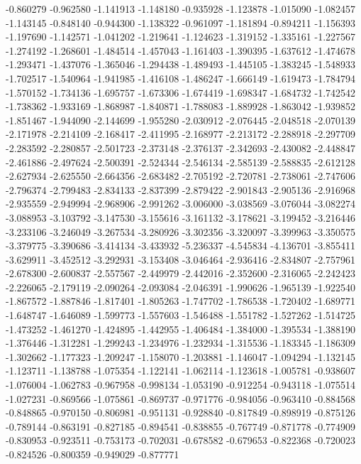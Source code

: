 -0.860279
-0.962580
-1.141913
-1.148180
-0.935928
-1.123878
-1.015090
-1.082457
-1.143145
-0.848140
-0.944300
-1.138322
-0.961097
-1.181894
-0.894211
-1.156393
-1.197690
-1.142571
-1.041202
-1.219641
-1.124623
-1.319152
-1.335161
-1.227567
-1.274192
-1.268601
-1.484514
-1.457043
-1.161403
-1.390395
-1.637612
-1.474678
-1.293471
-1.437076
-1.365046
-1.294438
-1.489493
-1.445105
-1.383245
-1.548933
-1.702517
-1.540964
-1.941985
-1.416108
-1.486247
-1.666149
-1.619473
-1.784794
-1.570152
-1.734136
-1.695757
-1.673306
-1.674419
-1.698347
-1.684732
-1.742542
-1.738362
-1.933169
-1.868987
-1.840871
-1.788083
-1.889928
-1.863042
-1.939852
-1.851467
-1.944090
-2.144699
-1.955280
-2.030912
-2.076445
-2.048518
-2.070139
-2.171978
-2.214109
-2.168417
-2.411995
-2.168977
-2.213172
-2.288918
-2.297709
-2.283592
-2.280857
-2.501723
-2.373148
-2.376137
-2.342693
-2.430082
-2.448847
-2.461886
-2.497624
-2.500391
-2.524344
-2.546134
-2.585139
-2.588835
-2.612128
-2.627934
-2.625550
-2.664356
-2.683482
-2.705192
-2.720781
-2.738061
-2.747606
-2.796374
-2.799483
-2.834133
-2.837399
-2.879422
-2.901843
-2.905136
-2.916968
-2.935559
-2.949994
-2.968906
-2.991262
-3.006000
-3.038569
-3.076044
-3.082274
-3.088953
-3.103792
-3.147530
-3.155616
-3.161132
-3.178621
-3.199452
-3.216446
-3.233106
-3.246049
-3.267534
-3.280926
-3.302356
-3.320097
-3.399963
-3.350575
-3.379775
-3.390686
-3.414134
-3.433932
-5.236337
-4.545834
-4.136701
-3.855411
-3.629911
-3.452512
-3.292931
-3.153408
-3.046464
-2.936416
-2.834807
-2.757961
-2.678300
-2.600837
-2.557567
-2.449979
-2.442016
-2.352600
-2.316065
-2.242423
-2.226065
-2.179119
-2.090264
-2.093084
-2.046391
-1.990626
-1.965139
-1.922540
-1.867572
-1.887846
-1.817401
-1.805263
-1.747702
-1.786538
-1.720402
-1.689771
-1.648747
-1.646089
-1.599773
-1.557603
-1.546488
-1.551782
-1.527262
-1.514725
-1.473252
-1.461270
-1.424895
-1.442955
-1.406484
-1.384000
-1.395534
-1.388190
-1.376446
-1.312281
-1.299243
-1.234976
-1.232934
-1.315536
-1.183345
-1.186309
-1.302662
-1.177323
-1.209247
-1.158070
-1.203881
-1.146047
-1.094294
-1.132145
-1.123711
-1.138788
-1.075354
-1.122141
-1.062114
-1.123618
-1.005781
-0.938607
-1.076004
-1.062783
-0.967958
-0.998134
-1.053190
-0.912254
-0.943118
-1.075514
-1.027231
-0.869566
-1.075861
-0.869737
-0.971776
-0.984056
-0.963410
-0.884568
-0.848865
-0.970150
-0.806981
-0.951131
-0.928840
-0.817849
-0.898919
-0.875126
-0.789144
-0.863191
-0.827185
-0.894541
-0.838855
-0.767749
-0.871778
-0.774909
-0.830953
-0.923511
-0.753173
-0.702031
-0.678582
-0.679653
-0.822368
-0.720023
-0.824526
-0.800359
-0.949029
-0.877771
